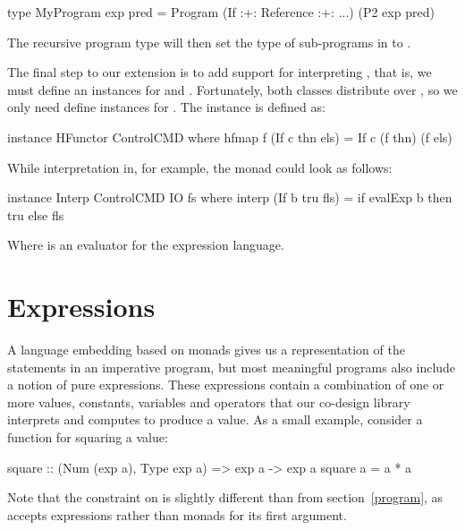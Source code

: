 \documentclass[../paper.tex]{subfiles}
\begin{document}
\begin{code}
type MyProgram exp pred = Program (If :+: Reference :+: ...) (P2 exp pred)
\end{code}

\noindent The recursive program type will then set the type of sub-programs in  to .

The final step to our extension is to add support for interpreting , that is, we must define an instances for  and . Fortunately, both classes distribute over \codei{(:+:)}, so we only need define instances for . The  instance is defined as:

\begin{code}
instance HFunctor ControlCMD where
  hfmap f (If c thn els) = If c (f thn) (f els)
\end{code}

\noindent While interpretation in, for example, the  monad could look as follows:

\begin{code}
instance Interp ControlCMD IO fs where
  interp (If b tru fls) = if evalExp b then tru else fls
\end{code}

\noindent Where  is an evaluator for the expression language.

\section{Expressions}
\label{expr}

A language embedding based on monads gives us a representation of the statements in an imperative program, but most meaningful programs also include a notion of pure expressions. These expressions contain a combination of one or more values, constants, variables and operators that our co-design library interprets and computes to produce a value. As a small example, consider a function for squaring a value:

\begin{code}
square :: (Num (exp a), Type exp a) => exp a -> exp a
square a = a * a
\end{code}

\noindent Note that the  constraint on  is slightly different than  from section~\ref{program}, as  accepts expressions rather than monads for its first argument.
\end{document}
